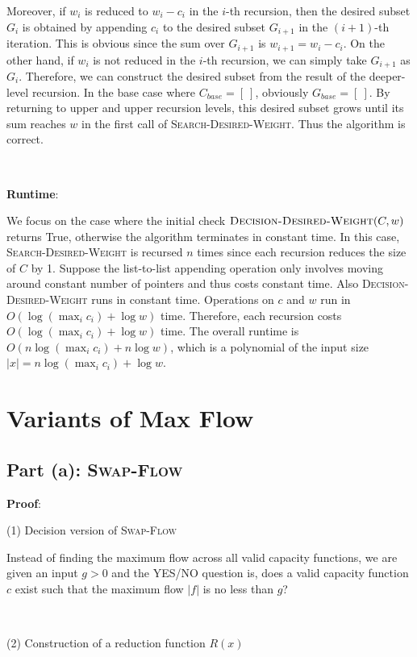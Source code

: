 \documentclass{article}
\begin{document}
Moreover, if $w_i$ is reduced to $w_i-c_i$ in the $i$-th recursion, then the desired subset $G_i$ is obtained by appending $c_i$ to the desired subset $G_{i+1}$ in the $(i+1)$-th iteration. This is obvious since the sum over $G_{i+1}$ is $w_{i+1}=w_i-c_i$. On the other hand, if $w_i$ is not reduced in the $i$-th recursion, we can simply take $G_{i+1}$ as $G_i$. Therefore, we can construct the desired subset from the result of the deeper-level recursion. In the base case where $C_{base}=[~]$, obviously $G_{base}=[~]$. By returning to upper and upper recursion levels, this desired subset grows until its sum reaches $w$ in the first call of \textsc{Search-Desired-Weight}. Thus the algorithm is correct.

~

\noindent\textbf{Runtime}:

We focus on the case where the initial check $\textsc{Decision-Desired-Weight}(C,w)$ returns True, otherwise the algorithm terminates in constant time. In this case, \textsc{Search-Desired-Weight} is recursed $n$ times since each recursion reduces the size of $C$ by 1. Suppose the list-to-list appending operation only involves moving around constant number of pointers and thus costs constant time. Also \textsc{Decision-Desired-Weight} runs in constant time. Operations on $c$ and $w$ run in $O(\log(\max_ic_i)+\log w)$ time. Therefore, each recursion costs $O(\log(\max_ic_i)+\log w)$ time. The overall runtime is $O(n\log(\max_ic_i)+n\log w)$, which is a polynomial of the input size $|x|=n\log(\max_ic_i)+\log w$.

\section{Variants of Max Flow}
\subsection{Part (a): \textsc{Swap-Flow}}
\noindent\textbf{Proof}:

\noindent(1) Decision version of \textsc{Swap-Flow}

Instead of finding the maximum flow across all valid capacity functions, we are given an input $g>0$ and the YES/NO question is, does a valid capacity function $c$ exist such that the maximum flow $|f|$ is no less than $g$?

~

\noindent(2) Construction of a reduction function $R(x)$
\end{document}
